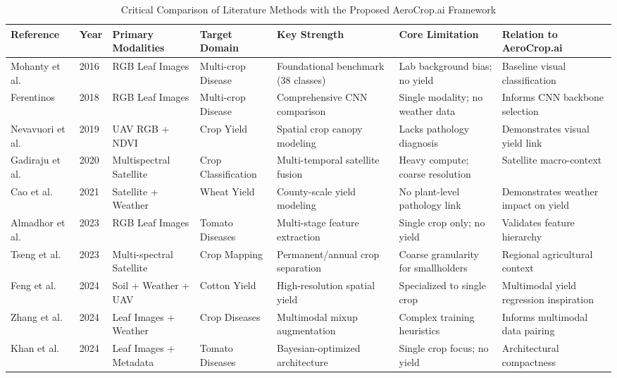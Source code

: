 \documentclass[conference]{IEEEtran}
\begin{document}
\begin{table}[t]
\centering
\caption{Critical Comparison of Literature Methods with the Proposed AeroCrop.ai Framework}
\label{tab:lit_comparison}
\begin{tabular}{@{}lllllll@{}}
\toprule
\textbf{Reference} & \textbf{Year} & \textbf{Primary Modalities} & \textbf{Target Domain} & \textbf{Key Strength} & \textbf{Core Limitation} & \textbf{Relation to AeroCrop.ai} \\
\midrule
Mohanty et al.~\cite{mohanty2016} & 2016 & RGB Leaf Images & Multi-crop Disease & Foundational benchmark ($38$ classes) & Lab background bias; no yield & Baseline visual classification \\
Ferentinos~\cite{ferentinos2018} & 2018 & RGB Leaf Images & Multi-crop Disease & Comprehensive CNN comparison & Single modality; no weather data & Informs CNN backbone selection \\
Nevavuori et al.~\cite{nevavuori2019} & 2019 & UAV RGB + NDVI & Crop Yield & Spatial crop canopy modeling & Lacks pathology diagnosis & Demonstrates visual yield link \\
Gadiraju et al.~\cite{gadiraju2020} & 2020 & Multispectral Satellite & Crop Classification & Multi-temporal satellite fusion & Heavy compute; coarse resolution & Satellite macro-context \\
Cao et al.~\cite{cao2021} & 2021 & Satellite + Weather & Wheat Yield & County-scale yield modeling & No plant-level pathology link & Demonstrates weather impact on yield \\
Almadhor et al.~\cite{almadhor2023} & 2023 & RGB Leaf Images & Tomato Diseases & Multi-stage feature extraction & Single crop only; no yield & Validates feature hierarchy \\
Tseng et al.~\cite{tseng2023} & 2023 & Multi-spectral Satellite & Crop Mapping & Permanent/annual crop separation & Coarse granularity for smallholders & Regional agricultural context \\
Feng et al.~\cite{feng2024} & 2024 & Soil + Weather + UAV & Cotton Yield & High-resolution spatial yield & Specialized to single crop & Multimodal yield regression inspiration \\
Zhang et al.~\cite{zhang2024} & 2024 & Leaf Images + Weather & Crop Diseases & Multimodal mixup augmentation & Complex training heuristics & Informs multimodal data pairing \\
Khan et al.~\cite{khan2024} & 2024 & Leaf Images + Metadata & Tomato Diseases & Bayesian-optimized architecture & Single crop focus; no yield & Architectural compactness \\

\end{tabular}
\end{table}
\end{document}
